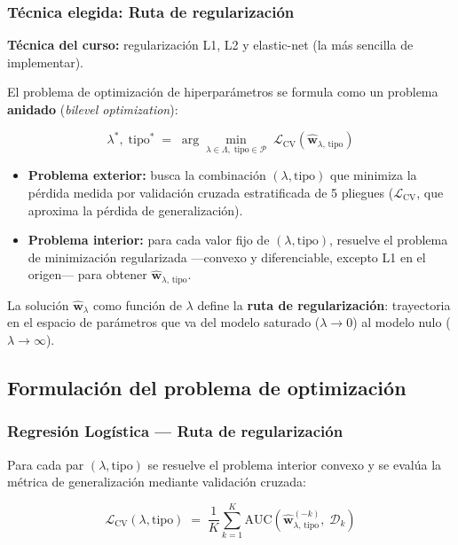 \documentclass[spanish]{article}
\begin{document}
\subsubsection{Técnica elegida: Ruta de regularización}

\textbf{Técnica del curso:} regularización L1, L2 y elastic-net (la más sencilla de implementar).

El problema de optimización de hiperparámetros se formula como un problema \textbf{anidado} (\textit{bilevel optimization}):

\begin{equation}
\lambda^*,\; \text{tipo}^* \;=\; \arg\min_{\lambda \in \Lambda,\; \text{tipo} \in \mathcal{P}} \;\mathcal{L}_{\mathrm{CV}}\!\left(\hat{\mathbf{w}}_{\lambda,\,\text{tipo}}\right)
\end{equation}

\begin{itemize}
    \item \textbf{Problema exterior:} busca la combinación $(\lambda, \text{tipo})$ que minimiza la pérdida medida por validación cruzada estratificada de 5 pliegues ($\mathcal{L}_{\mathrm{CV}}$, que aproxima la pérdida de generalización).
    \item \textbf{Problema interior:} para cada valor fijo de $(\lambda, \text{tipo})$, resuelve el problema de minimización regularizada —convexo y diferenciable, excepto L1 en el origen— para obtener $\hat{\mathbf{w}}_{\lambda,\,\text{tipo}}$.
\end{itemize}

La solución $\hat{\mathbf{w}}_\lambda$ como función de $\lambda$ define la \textbf{ruta de regularización}: trayectoria en el espacio de parámetros que va del modelo saturado ($\lambda \to 0$) al modelo nulo ($\lambda \to \infty$).

\subsection{Formulación del problema de optimización}

\subsubsection{Regresión Logística — Ruta de regularización}

Para cada par $(\lambda, \text{tipo})$ se resuelve el problema interior convexo y se evalúa la métrica de generalización mediante validación cruzada:

\begin{equation}
\mathcal{L}_{\mathrm{CV}}(\lambda, \text{tipo}) \;=\; \frac{1}{K}\sum_{k=1}^{K} \mathrm{AUC}\!\left(\hat{\mathbf{w}}_{\lambda,\,\text{tipo}}^{(-k)},\; \mathcal{D}_k\right)
\end{equation}
\end{document}
